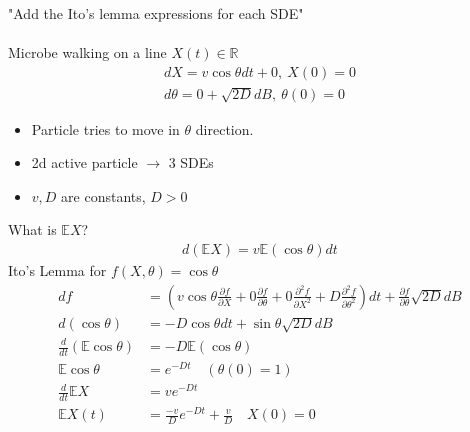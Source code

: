 \documentclass[12pt, letterpaper]{article}
\begin{document}
"Add the Ito's lemma expressions for each SDE" \\\\
 Microbe walking on a line $X(t) \in \mathbb{R}$
\begin{align*}
    dX = v\cos \theta dt + 0,\ X(0) = 0 \\
    d\theta = 0 + \sqrt{2D}dB,\ \theta(0) = 0 
\end{align*}
\begin{itemize}
    \item Particle tries to move in $\theta$ direction.
    \item 2d active particle $\rightarrow$ 3 SDEs
    \item $v,D$ are constants, $D>0$
\end{itemize}
What is $\mathbb{E}X$?
\begin{align*}
    d(\mathbb{E}X) = v\mathbb{E}(\cos \theta)dt 
\end{align*}
Ito's Lemma for $f(X,\theta) = \cos \theta$
\begin{align*}
    df &= \left( v\cos \theta \frac{\partial f}{\partial X} + 0 \frac{\partial f}{\partial \theta} + 0\frac{\partial^2 f}{\partial X^2} + D\frac{\partial^2f}{\partial \theta^2} \right)dt + \frac{\partial f}{\partial \theta}\sqrt{2D}dB \\
    d(\cos \theta) &= -D\cos \theta dt + \sin \theta \sqrt{2D}dB \\
    \frac{d}{dt}(\mathbb{E}\cos\theta) &= -D\mathbb{E}(\cos\theta) \\
    \mathbb{E} \cos\theta &= e^{-Dt} \quad (\theta(0) = 1) \\
    \frac{d}{dt}\mathbb{E}X &= ve^{-Dt} \\
    \mathbb{E}X(t) &= \frac{-v}{D}e^{-Dt}+\frac vD\quad X(0) = 0
\end{align*}
\end{document}
